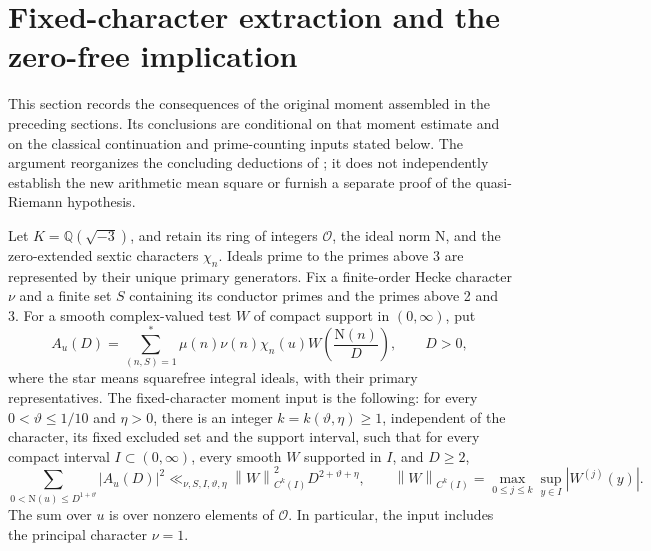 \documentclass[11pt]{article}
\numberwithin{equation}{section}
\theoremstyle{definition}
\theoremstyle{remark}
\newcommand{\OO}{\mathcal O}
\newcommand{\N}{\mathrm N}
\newcommand{\norm}[1]{\left\|#1\right\|}
\begin{document}

\section{Fixed-character extraction and the zero-free implication}
\label{sec:final-extraction}

This section records the consequences of the original moment assembled
in the preceding sections. Its conclusions are conditional on that
moment estimate and on the classical continuation and prime-counting
inputs stated below. The argument reorganizes the concluding deductions
of \cite{Source}; it does not independently establish the new arithmetic
mean square or furnish a separate proof of the quasi-Riemann hypothesis.

Let \(K=\mathbb Q(\sqrt{-3})\), and retain its ring of integers
\(\OO\), the ideal norm \(\N\), and the zero-extended sextic characters
\(\chi_n\). Ideals prime to the primes above 3 are represented by their
unique primary generators. Fix a finite-order Hecke character \(\nu\)
and a finite set \(S\) containing its conductor primes and the primes
above 2 and 3. For a smooth complex-valued test \(W\) of compact support
in \((0,\infty)\), put
\begin{equation}\label{eq:final-A}
 A_u(D)=\sum_{(n,S)=1}^{*}\mu(n)\nu(n)\chi_n(u)
                  W\!\left(\frac{\N(n)}D\right),\qquad D>0,
\end{equation}
where the star means squarefree integral ideals, with their primary
representatives. The fixed-character moment input is the following:
for every \(0<\vartheta\le1/10\) and \(\eta>0\), there is an integer
\(k=k(\vartheta,\eta)\ge1\), independent of the character, its fixed
excluded set and the support interval, such that for every compact
interval \(I\subset(0,\infty)\), every smooth \(W\) supported in
\(I\), and \(D\ge2\),
\begin{equation}\label{eq:final-moment-input}
 \sum_{0<\N(u)\le D^{1+\vartheta}}|A_u(D)|^2
 \ll_{\nu,S,I,\vartheta,\eta}
       \norm{W}_{C^k(I)}^2 D^{2+\vartheta+\eta},
 \qquad
 \norm{W}_{C^k(I)}=\max_{0\le j\le k}\sup_{y\in I}|W^{(j)}(y)|.
\end{equation}
The sum over \(u\) is over nonzero elements of \(\OO\). In particular,
the input includes the principal character \(\nu=1\).
\end{document}
